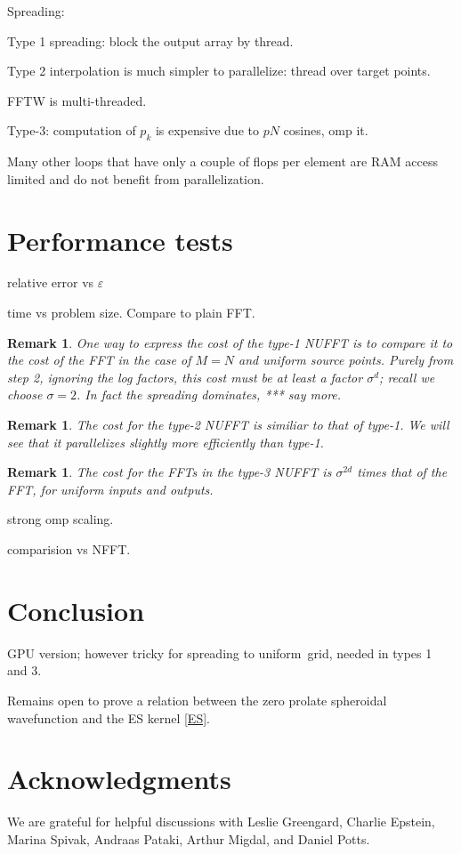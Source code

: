 \documentclass[10pt]{article}
\newcommand{\eps}{\varepsilon}
\newtheorem{rmk}[thm]{Remark}
\newcommand{\rat}{\sigma}          %
\newcommand{\U}{{uniform}}
\begin{document}
Spreading:

Type 1 spreading:
block the output array by thread.

Type 2 interpolation is much simpler to parallelize:
thread over target points.

FFTW is multi-threaded.

Type-3:
computation of $p_k$ is expensive due to $pN$ cosines,
omp it.

Many other loops that have only a couple of flops
per element are RAM access limited and do not benefit
from parallelization.


\section{Performance tests}

relative error vs $\eps$

time vs problem size.
Compare to plain FFT.

\begin{rmk}
  One way to express the cost of the type-1 NUFFT
  is to compare it to the cost of the FFT in the case of $M=N$
  and uniform source points.
  Purely from step 2, ignoring the log factors,
  this cost must be at least a factor $\rat^d$; recall we choose $\rat=2$.
  In fact the spreading dominates,
  *** say more.
\end{rmk}
\begin{rmk}
  The cost for the type-2 NUFFT is similiar to that of type-1.
  We will see that it parallelizes slightly more efficiently
  than type-1.
\end{rmk}
\begin{rmk}
  The cost for the FFTs in the type-3 NUFFT is $\rat^{2d}$ times that of
  the FFT, for uniform inputs and outputs.
\end{rmk}




strong omp scaling.

comparision vs NFFT.


\section{Conclusion}



GPU version; however tricky for spreading to \U\ grid, needed in types 1 and 3.


Remains open to prove a relation between the zero prolate spheroidal
wavefunction and the ES kernel \eqref{ES}.


\section*{Acknowledgments}

We are grateful for helpful discussions with Leslie Greengard,
Charlie Epstein, Marina Spivak, Andraas Pataki, Arthur Migdal, and
Daniel Potts.




\end{document}

